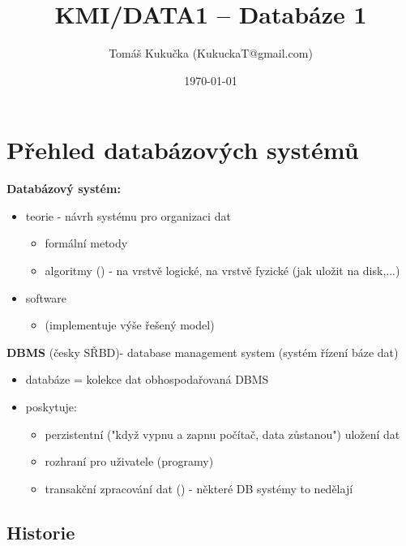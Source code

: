 \documentclass[10pt, a4paper, titlepage]{article}
\title{KMI/DATA1  -- Databáze 1}
\author{Tomáš Kukučka (KukuckaT@gmail.com)}
\date{\today}
\theoremstyle{note}
\begin{document}
\maketitle

\section{Přehled databázových systémů}
\textbf{Databázový systém:}
\begin{itemize}
	\item teorie - návrh systému pro organizaci dat
	\begin{itemize}
		\item formální metody
		\item algoritmy () - na vrstvě logické, na vrstvě fyzické (jak uložit na disk,...)
	\end{itemize}
	\item software
	\begin{itemize}
		\item {} (implementuje výše řešený model)
	\end{itemize}
\end{itemize}

\textbf{DBMS} (česky SŘBD)- database management system (systém řízení báze dat)
\begin{itemize}	
	\item databáze = kolekce dat obhospodařovaná DBMS
	\item poskytuje:
	\begin{itemize}
		\item perzistentní ("když vypnu a zapnu počítač, data zůstanou") uložení dat
		\item rozhraní pro uživatele (programy)
		\item transakční zpracování dat () - některé DB systémy to nedělají
	\end{itemize}
\end{itemize}		 


\subsection{Historie}
\end{document}
